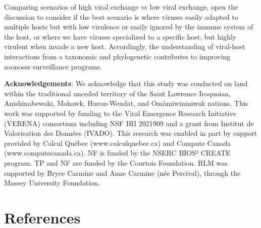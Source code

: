 \documentclass[11pt]{article}
\begin{document}
Comparing scenarios of high viral exchange vs low viral exchange, open
the discussion to consider if the best scenario is where viruses easily
adapted to multiple hosts but with low virulence or easily ignored by
the immune system of the host, or where we have viruses specialized to a
specific host, but highly virulent when invade a new host. Accordingly,
the understanding of viral-host interactions from a taxonomic and
phylogenetic contributes to improving zoonoses surveillance programs.

\textbf{Acknowledgements}: We acknowledge that this study was conducted
on land within the traditional unceded territory of the Saint Lawrence
Iroquoian, Anishinabewaki, Mohawk, Huron-Wendat, and Omàmiwininiwak
nations. This work was supported by funding to the Viral Emergence
Research Initiative (VERENA) consortium including NSF BII 2021909 and a
grant from Institut de Valorisation des Données (IVADO). This research
was enabled in part by support provided by Calcul Québec
(www.calculquebec.ca) and Compute Canada (www.computecanada.ca). NF is
funded by the NSERC BIOS² CREATE program. TP and NF are funded by the
Courtois Foundation. RLM was supported by Bryce Carmine and Anne Carmine
(née Percival), through the Massey University Foundation.

\hypertarget{references}{%
\section*{References}\label{references}}
\end{document}
